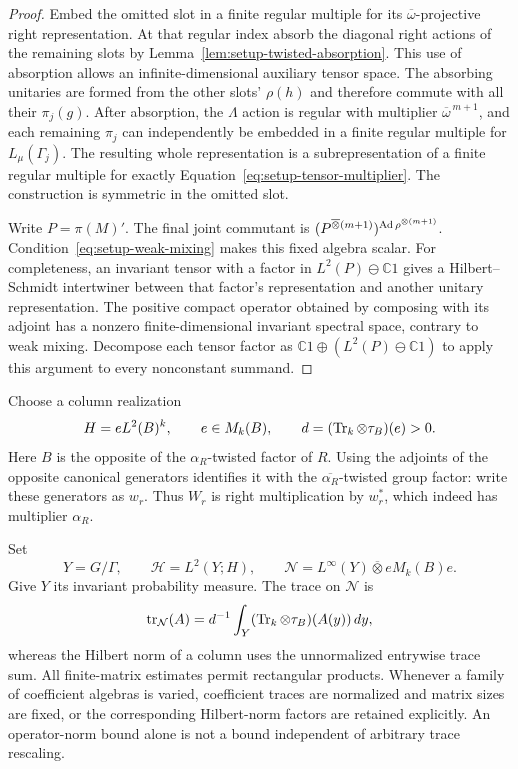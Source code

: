 \begin{proof}
Embed the omitted slot in a finite regular multiple for its
$\overline\omega$-projective right representation.  At that regular
index absorb the diagonal right actions of the remaining slots by
Lemma~\ref{lem:setup-twisted-absorption}.  This use of absorption
allows an infinite-dimensional auxiliary tensor space.  The
absorbing unitaries are formed from the other slots' $\rho(h)$ and
therefore commute with all their $\pi_j(g)$.  After absorption,
the $\Lambda$ action is regular with multiplier
$\overline\omega^{\,m+1}$, and each remaining $\pi_j$ can
independently be embedded in a finite regular multiple for
$L_\mu(\Gamma_j)$.  The resulting whole representation is a
subrepresentation of a finite regular multiple for exactly
Equation~\eqref{eq:setup-tensor-multiplier}.  The construction is
symmetric in the omitted slot.

Write $P=\pi(M)'$.  The final joint commutant is
$(P^{\overline\otimes(m+1)})^{\operatorname{Ad}\rho^{\otimes(m+1)}}$.
Condition~\eqref{eq:setup-weak-mixing} makes this fixed algebra
scalar.  For completeness, an invariant tensor with a factor in
$L^2(P)\ominus\mathbb C1$ gives a Hilbert--Schmidt intertwiner
between that factor's representation and another unitary
representation.  The positive compact operator obtained by composing
with its adjoint has a nonzero finite-dimensional invariant spectral
space, contrary to weak mixing.  Decompose each tensor factor as
$\mathbb C1\oplus(L^2(P)\ominus\mathbb C1)$ to apply this
argument to every nonconstant summand.
\end{proof}

Choose a column realization
\[
 H=eL^2(B)^k,\qquad e\in M_k(B),\qquad
 d=(\operatorname{Tr}_k\otimes\tau_B)(e)>0.
\]
Here $B$ is the opposite of the $\alpha_R$-twisted factor of $R$.
Using the adjoints of the opposite canonical generators identifies
it with the $\overline{\alpha_R}$-twisted group factor: write these
generators as $w_r$.  Thus $W_r$ is right multiplication by $w_r^*$,
which indeed has multiplier $\alpha_R$.

Set
\begin{equation}
 Y=G/\Gamma,\qquad
 \mathcal H=L^2(Y;H),\qquad
 \mathcal N=L^\infty(Y)\overline\otimes eM_k(B)e.
 \label{eq:setup-induced-model}
\end{equation}
Give $Y$ its invariant probability measure.  The trace on
$\mathcal N$ is
\[
 \operatorname{tr}_{\mathcal N}(A)
    =d^{-1}\int_Y(\operatorname{Tr}_k\otimes\tau_B)(A(y))\,dy,
\]
whereas the Hilbert norm of a column uses the unnormalized entrywise
trace sum.  All finite-matrix estimates permit rectangular products.
Whenever a family of coefficient algebras is varied, coefficient
traces are normalized and matrix sizes are fixed, or the corresponding
Hilbert-norm factors are retained explicitly.  An operator-norm bound
alone is not a bound independent of arbitrary trace rescaling.

